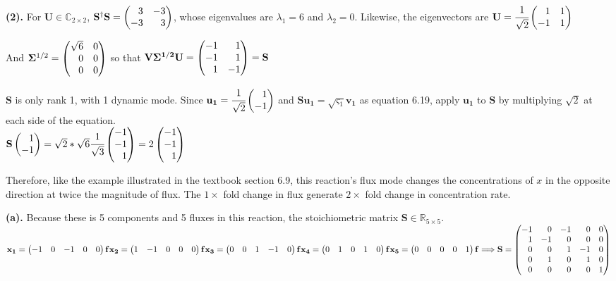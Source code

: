 \documentclass[12pt,a4paper]{article}
\begin{document}
    \noindent \textbf{(2). } For $\mathbf{U}\in\mathbb{C}_{2\times 2}$, $\mathbf{S^\dagger S}=\newvec{3&-3\\-3&3}$, whose eigenvalues are $\lambda_1=6$ and $\lambda_2=0$. Likewise, the eigenvectors are $\mathbf{U}=\sqrtfrac{1}{2}\newvec{1&1\\-1&1}$

    And $\mathbf{\Sigma}^{1/2}=\newvec{\sqrt{6}&0\\0&0\\0&0}$ so that $\mathbf{V\Sigma^{1/2}U}=\newvec{-1&1\\-1&1\\1&-1}=\mathbf{S}$

    $\mathbf{S}$ is only rank 1, with 1 dynamic mode. Since $\mathbf{u_1}=\sqrtfrac{1}{2}\newvec{1\\-1}$ and $\mathbf{Su_1}=\sqrt{\varsigma_1}\mathbf{v_1}$ as equation 6.19, apply $\mathbf{u_1}$ to $\mathbf{S}$ by multiplying $\sqrt{2}$ at each side of the equation. \\
    $\mathbf{S}\newvec{1\\-1}=\sqrt{2}*\sqrt{6}\sqrtfrac{1}{3}\newvec{-1\\-1\\1}=2\newvec{-1\\-1\\1}$

    Therefore, like the example illustrated in the textbook section 6.9, this reaction's flux mode changes the concentrations of $x$ in the opposite direction at twice the magnitude of flux. The $1\times$ fold change in flux generate $2\times$ fold change in concentration rate.

    \newpage
    \noindent \textbf{(a).} Because these is 5 components and 5 fluxes in this reaction, the stoichiometric matrix $\mathbf{S}\in \mathbb{R}_{5\times 5}$.\\
    $\mathbf{x_1}=\newvec{-1&0&-1&0&0}\mathbf{f}\\
    \mathbf{x_2}=\newvec{1&-1&0&0&0}\mathbf{f}\\
    \mathbf{x_3}=\newvec{0&0&1&-1&0}\mathbf{f}\\
    \mathbf{x_4}=\newvec{0&1&0&1&0}\mathbf{f}\\
    \mathbf{x_5}=\newvec{0&0&0&0&1}\mathbf{f}\Longrightarrow\\
    \mathbf{S}=\newvec{-1&0&-1&0&0\\1&-1&0&0&0\\0&0&1&-1&0\\0&1&0&1&0\\0&0&0&0&1}$
\end{document}
